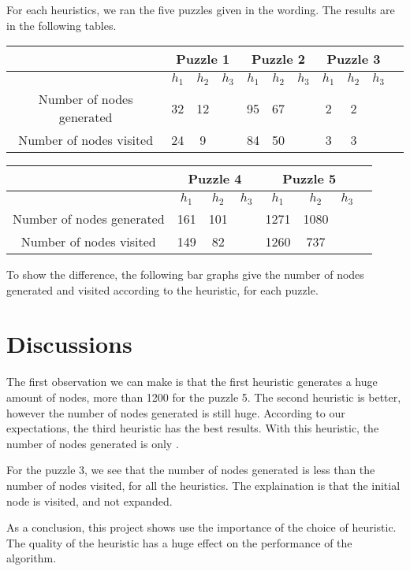 \documentclass[]{article}
\begin{document}
For each heuristics, we ran the five puzzles given in the wording.
The results are in the following tables.

\begin{center}
    \begin{tabular}{| c | c | c | c | c | c | c | c | c | c | c |}
      \cline{2-10} & \multicolumn{3}{|c|}{Puzzle 1} & \multicolumn{3}{|c|}{Puzzle 2} & \multicolumn{3}{|c|}{Puzzle 3} \\
      \hline
    & $h_1$ & $h_2$ & $h_3$ & $h_1$ & $h_2$& $h_3$ & $h_1$ &  $h_2$ & $h_3$ \\ \hline
    Number of nodes generated & 32 & 12 &  & 95 & 67 &  & 2 & 2 & \\ \hline
    Number of nodes visited   & 24 & 9  &  & 84 & 50 &  & 3 & 3 & \\ \hline
    \end{tabular}
\end{center}

\begin{center}
    \begin{tabular}{| c | c | c | c | c | c | c | c |}
      \cline{2-7} & \multicolumn{3}{|c|}{Puzzle 4} & \multicolumn{3}{|c|}{Puzzle 5} \\
      \hline
    & $h_1$ & $h_2$ & $h_3$ & $h_1$ & $h_2$& $h_3$ \\ \hline
    Number of nodes generated & 161 & 101 &       & 1271 & 1080 &   \\ \hline
    Number of nodes visited   & 149 & 82  &       & 1260 &  737 &  \\ \hline
    \end{tabular}
\end{center}

To show the difference, the following bar graphs give the number of nodes generated and visited according to the heuristic, for each puzzle.











\section{Discussions}

The first observation we can make is that the first heuristic generates a huge amount of nodes, more than 1200 for the puzzle 5.
The second heuristic is better, however the number of nodes generated is still huge.
According to our expectations, the third heuristic has the best results.
With this heuristic, the number of nodes generated is only .


For the puzzle 3, we see that the number of nodes generated is less than the number of nodes visited, for all the heuristics.
The explaination is that the initial node is visited, and not expanded.


As a conclusion, this project shows use the importance of the choice of heuristic.
The quality of the heuristic has a huge effect on the performance of the algorithm.
\end{document}
